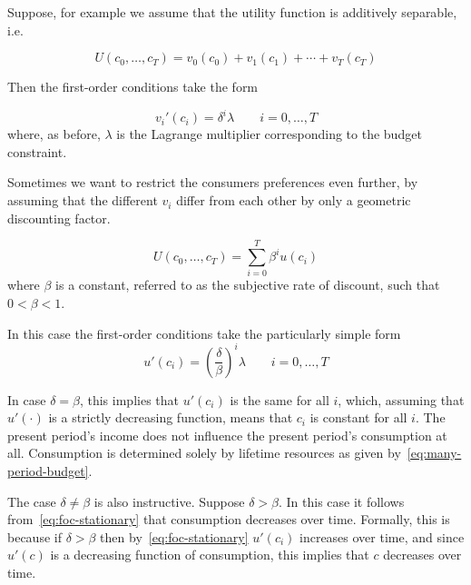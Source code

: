 \documentclass[11pt,reqno,openany]{amsbook}
\theoremstyle{plain}
\theoremstyle{definition}
\begin{document}
Suppose, for example we assume that the utility function is additively
separable, i.e.

\begin{equation}\label{eq:utility-addsep}
U(c_0,\ldots,c_T)=v_0(c_0)+v_1(c_1)+\cdots+v_T(c_T)
\end{equation}

Then the first-order conditions take the form

\begin{equation}\label{eq:foc-additively-separable}
v_i'(c_i) = \delta^i \lambda \qquad i=0,\ldots,T
\end{equation}
where, as before, $\lambda$ is the Lagrange multiplier corresponding
to the budget constraint.

Sometimes we want to restrict the consumers preferences even further,
by assuming that the different $v_i$ differ from each other by only a
geometric discounting factor.

\begin{equation}\label{eq:utility-geometric}
U(c_0,\ldots,c_T)=\sum_{i=0}^T \beta^i u(c_i)
\end{equation}
where $\beta$ is a constant, referred to as the subjective rate of
discount, such that $0<\beta<1$.  

In this case the first-order conditions take the particularly simple
form
\begin{equation}\label{eq:foc-stationary}
u'(c_i)=\left(\frac{\delta}{\beta}\right)^i \lambda \qquad i=0,\ldots,T
\end{equation}

In case $\delta=\beta$, this implies that $u'(c_i)$ is the same for
all $i$, which, assuming that $u'(\cdot)$ is a strictly decreasing
function, means that $c_i$ is constant for all $i$. The present
period's income does not influence the present period's consumption at
all. Consumption is determined solely by lifetime resources as given
by~\eqref{eq:many-period-budget}.

The case $\delta \neq \beta$ is also instructive. Suppose
$\delta>\beta$. In this case it follows from~\eqref{eq:foc-stationary}
that consumption decreases over time. Formally, this is because if
$\delta>\beta$ then by~\eqref{eq:foc-stationary} $u'(c_i)$ increases
over time, and since $u'(c)$ is a decreasing function of consumption,
this implies that $c$ decreases over time. 
\end{document}
